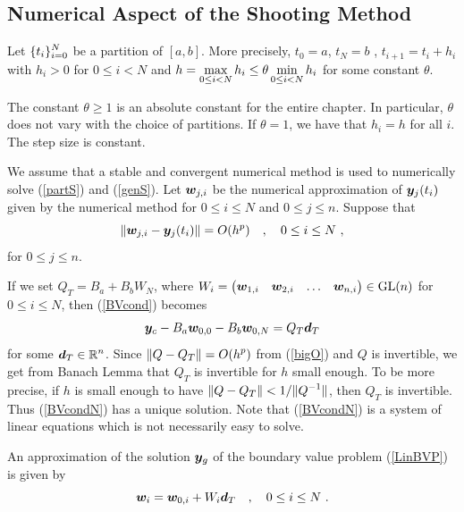 \subsection{Numerical Aspect of the Shooting Method}

Let $\displaystyle \{t_i\}_{i=0}^N$ be a partition of $[a,b]$.  More
precisely, $t_0 = a$, $t_N = b$ , $t_{i+1} = t_i + h_i$ with $h_i > 0$
for $0\leq i < N$ and
$\displaystyle h = \max_{0\leq i < N} h_i \leq \theta \min_{0\leq i < N} h_i$
for some constant $\theta$.

\begin{rmk}[Important]
The constant $\theta \geq 1$ is an absolute constant for the entire
chapter.  In particular, $\theta$ does not vary with the choice of
partitions.  If $\theta = 1$, we have that $h_i = h$ for all $i$.  The
step size is constant.
\end{rmk}

We assume that a stable and convergent numerical method is used to
numerically solve (\ref{partS}) and (\ref{genS}).  Let
$\bm{w}_{j,i}$ be the numerical approximation of $\bm{y}_j(t_i)$
given by the numerical method for $0\leq i \leq N$ and $0\leq j \leq n$.
Suppose that
\begin{equation} \label{bigO}
\| \bm{w}_{j,i} - \bm{y}_j(t_i) \| = O(h^p) \quad , \quad 0 \leq i
\leq N \ ,
\end{equation}
for $0\leq j \leq n$.

If we set $Q_T = B_a + B_b W_N$, where
$\displaystyle W_i = \begin{pmatrix}
\bm{w}_{1,i} & \bm{w}_{2,i} & \ldots & \bm{w}_{n,i} \end{pmatrix}
\in \mathrm{GL}(n)$ for $0 \leq i \leq N$, then (\ref{BVcond}) becomes
\begin{equation} \label{BVcondN}
\bm{y}_c - B_a \bm{w}_{0,0} - B_b \bm{w}_{0,N} = Q_T\bm{d}_T
\end{equation}
for some $\displaystyle \bm{d}_T \in \mathbb{R}^n$.
Since $\displaystyle \| Q - Q_T \| = O(h^p)$ from (\ref{bigO}) and $Q$ is
invertible, we get from Banach Lemma that $Q_T$ is invertible for $h$
small enough.  To be more precise, if $h$ is small enough to have
$\displaystyle \|Q - Q_T\| < 1/\|Q^{-1}\|$, then $Q_T$ is invertible.  Thus
(\ref{BVcondN}) has a unique solution.  Note that (\ref{BVcondN}) is a
system of linear equations which is not necessarily easy to solve.

An approximation of the solution $\bm{y}_g$ of the boundary value
problem (\ref{LinBVP}) is given by
\[
\bm{w}_i = \bm{w}_{0,i} + W_i \bm{d}_T \quad , \quad 0 \leq i \leq N \ .
\]

